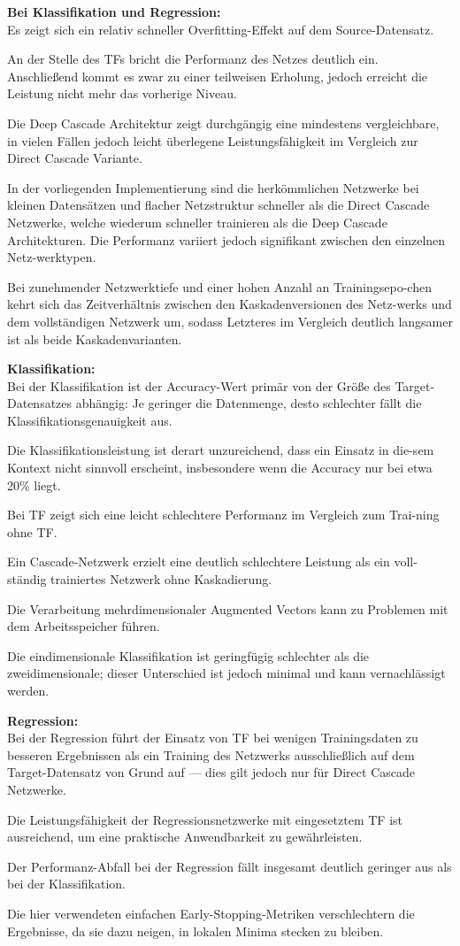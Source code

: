 \textbf{Bei Klassifikation und Regression:}\\
Es zeigt sich ein relativ schneller Overfitting-Effekt auf dem Source-Datensatz.

An der Stelle des TFs bricht die Performanz des Netzes deutlich ein. Anschließend kommt es zwar zu einer teilweisen Erholung, 
jedoch erreicht die Leistung nicht mehr das vorherige Niveau.

Die Deep Cascade Architektur zeigt durchgängig eine mindestens vergleichbare, in vielen Fällen jedoch leicht überlegene Leistungsfähigkeit im 
Vergleich zur Direct Cascade Variante.

In der vorliegenden Implementierung sind die herkömmlichen Netzwerke bei kleinen Datensätzen und flacher Netzstruktur schneller als die Direct 
Cascade Netzwerke, welche wiederum schneller trainieren als die Deep Cascade Architekturen. Die Performanz variiert jedoch signifikant 
zwischen den einzelnen Netz-werktypen. 

Bei zunehmender Netzwerktiefe und einer hohen Anzahl an Trainingsepo-chen kehrt sich das Zeitverhältnis zwischen den Kaskadenversionen des 
Netz-werks und dem vollständigen Netzwerk um, sodass Letzteres im Vergleich deutlich langsamer ist als beide Kaskadenvarianten.

\textbf{Klassifikation:}\\
Bei der Klassifikation ist der Accuracy-Wert primär von der Größe des Target-Datensatzes abhängig: Je geringer die Datenmenge, desto 
schlechter fällt die Klassifikationsgenauigkeit aus.

Die Klassifikationsleistung ist derart unzureichend, dass ein Einsatz in die-sem Kontext nicht sinnvoll erscheint, insbesondere wenn die 
Accuracy nur bei etwa 20\% liegt.

Bei TF zeigt sich eine leicht schlechtere Performanz im Vergleich zum Trai-ning ohne TF.

Ein Cascade-Netzwerk erzielt eine deutlich schlechtere Leistung als ein voll-ständig trainiertes Netzwerk ohne Kaskadierung.

Die Verarbeitung mehrdimensionaler Augmented Vectors kann zu Problemen mit dem Arbeitsspeicher führen.

Die eindimensionale Klassifikation ist geringfügig schlechter als die zweidimensionale; dieser Unterschied ist jedoch minimal und kann 
vernachlässigt werden.

\textbf{Regression:}\\
Bei der Regression führt der Einsatz von TF bei wenigen Trainingsdaten zu besseren Ergebnissen als ein Training des Netzwerks ausschließlich 
auf dem Target-Datensatz von Grund auf — dies gilt jedoch nur für Direct Cascade Netzwerke.

Die Leistungsfähigkeit der Regressionsnetzwerke mit eingesetztem TF ist ausreichend, um eine praktische Anwendbarkeit zu gewährleisten.

Der Performanz-Abfall bei der Regression fällt insgesamt deutlich geringer aus als bei der Klassifikation.

Die hier verwendeten einfachen Early-Stopping-Metriken verschlechtern die Ergebnisse, da sie dazu neigen, in lokalen Minima stecken zu bleiben.
